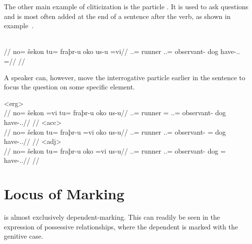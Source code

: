 The other main example of cliticization is the particle . It is used to ask questions and is most often added at the end of a sentence after the verb, as shown in example~.

	\begingl
		\glpreamble{}\\
		//
		\gla no= šekon tu= fraþr-u oko us-u =vi//
		\glb \An.\Sg.\Top{}= runner \An.\Sg.\Acc{}= observant-\An{} dog have-\Ind.\Npst.\Ipfv{} =\Int//
		\glft{}//
	\endgl
\xe

A speaker can, however, move the interrogative particle earlier in the sentence to focus the question on some specific element.

	\a<erg>\begingl
		\glpreamble{}\\
		//
		\gla no= šekon =vi tu= fraþr-u oko us-u//
		\glb \An.\Sg.\Top{}= runner =\Int{} \An.\Sg.\Acc{}= observant-\An{} dog have-\Ind.\Npst.\Ipfv//
		\glft{}//
	\endgl
	\a<acc>\begingl
		\glpreamble{}\\
		//
		\gla no= šekon tu= fraþr-u =vi oko us-u//
		\glb \An.\Sg.\Top{}= runner \An.\Sg.\Acc{}= observant-\An{} =\Int{} dog have-\Ind.\Npst.\Ipfv//
		\glft{}//
	\endgl
	\a<adj>\begingl
		\glpreamble{}\\
		//
		\gla no= šekon tu= fraþr-u oko =vi us-u//
		\glb \An.\Sg.\Top{}= runner \An.\Sg.\Acc{}= observant-\An{} dog =\Int{} have-\Ind.\Npst.\Ipfv//
		\glft{}//
	\endgl
\xe


\section{Locus of Marking}
\label{sec:tvk-locus}

\langtvk{} is almost exclusively dependent-marking\autocite{wals-25}. This can readily be seen in the expression of possessive relationships, where the dependent is marked with the genitive case.

